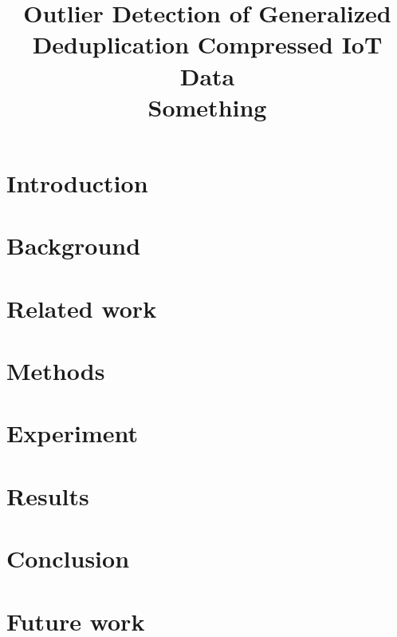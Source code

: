 \documentclass[conference]{IEEEtran}
\begin{document}
\title{Outlier Detection of Generalized Deduplication Compressed IoT Data\\
{\LARGE Something}\\
}

\author{
}

\maketitle
\thispagestyle{plain}
\pagestyle{plain}
\begin{abstract}
\end{abstract}

\begin{IEEEkeywords}
\end{IEEEkeywords}

\section{Introduction}


\section{Background}


\section{Related work}


\section{Methods}


\section{Experiment}


\section{Results}


\section{Conclusion}


\section{Future work}


\printbibliography[title={References}]
\end{document}
